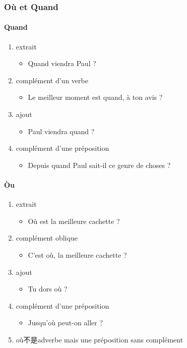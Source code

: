 \documentclass[UTF8]{report}
\begin{document}
\subsubsection{Où et Quand}
\paragraph{Quand}
\begin{enumerate}
    \item extrait
    \begin{itemize}
        \item Quand viendra Paul ?
    \end{itemize}
    \item complément d’un verbe
    \begin{itemize}
        \item Le meilleur moment est quand, à ton avis ?
    \end{itemize}
    \item ajout
    \begin{itemize}
        \item Paul viendra quand ?
    \end{itemize}
    \item complément d’une préposition
    \begin{itemize}
        \item Depuis quand Paul sait-il ce genre de choses ?
    \end{itemize}
\end{enumerate}
\paragraph{Òu}
\begin{enumerate}
    \item extrait
    \begin{itemize}
        \item Où est la meilleure cachette ?
    \end{itemize}
    \item complément oblique
    \begin{itemize}
        \item C’est où, la meilleure cachette ?
    \end{itemize}
    \item ajout
    \begin{itemize}
        \item Tu dors où ?
    \end{itemize}
    \item complément d’une préposition
    \begin{itemize}
        \item Jusqu’où peut-on aller ?
    \end{itemize}
    \item où不是adverbe mais une préposition sans complément
\end{enumerate}
\end{document}
